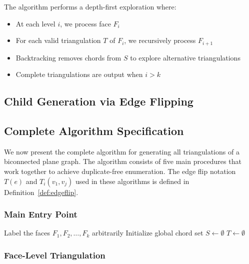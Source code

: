 \documentclass[12pt,a4paper]{article}
\theoremstyle{definition}
\theoremstyle{remark}
\begin{document}
The algorithm performs a depth-first exploration where:
\begin{itemize}
    \item At each level $i$, we process face $F_i$
    \item For each valid triangulation $T$ of $F_i$, we recursively process $F_{i+1}$
    \item Backtracking removes chords from $S$ to explore alternative triangulations
    \item Complete triangulations are output when $i > k$
\end{itemize}

\subsection{Child Generation via Edge Flipping}

\subsection{Complete Algorithm Specification}

We now present the complete algorithm for generating all triangulations of a biconnected plane graph. The algorithm consists of five main procedures that work together to achieve duplicate-free enumeration. The edge flip notation $T(e)$ and $T_i(v_1, v_j)$ used in these algorithms is defined in Definition~\ref{def:edgeflip}.


\subsubsection{Main Entry Point}

\begin{algorithm}
\caption{Start Triangulation Process}
\label{alg:start}
\begin{algorithmic}[1]
    \State Label the faces $F_1, F_2, \ldots, F_k$ arbitrarily
    \State Initialize global chord set $S \gets \emptyset$
    \State $T \gets \emptyset$ 
    \State {}
\EndProcedure
\end{algorithmic}
\end{algorithm}


\subsubsection{Face-Level Triangulation}
\end{document}
